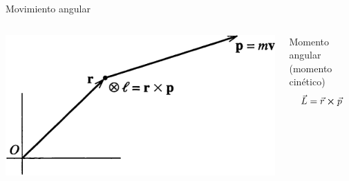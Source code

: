 \documentclass[serif]{beamer}
\begin{document}
\begin{frame}{Movimiento angular} 
\begin{columns}[c]
	\begin{column}{0.35\textwidth}
		\begin{block}{}
			\includegraphics[width=\textwidth]{taylor3_5}
		\end{block}
	\end{column}
  \begin{column}{0.6\textwidth}
		\begin{block}{Momento angular {\tiny (momento cinético)}}
		\[
			\vec{L} = \vec{r} \cp \vec{p}
		\]
		\end{block}
		\uncover<2>{
		\begin{block}{Torque {\tiny (momento, \(\vec{N}\))}}
			\[
							\dot{\vec{L}} = \cancel{ \dot{\vec{r}} \cp \vec{p}} + \vec{r} \cp \dot{\vec{p}}
			\]
			pues \( \vec{p}= m \dot{\vec{r}} \implies \vec{p} || \dot{\vec{r}} \implies \dot{\vec{r}} \cp \vec{p} = 0 \)
			\pause
			\[
				\vec{\tau} = \dot{\vec{L}}= \vec{r} \cp \vec{F}
			\]
		\end{block}
		}
	\end{column}
\end{columns}
\end{frame}
\end{document}
